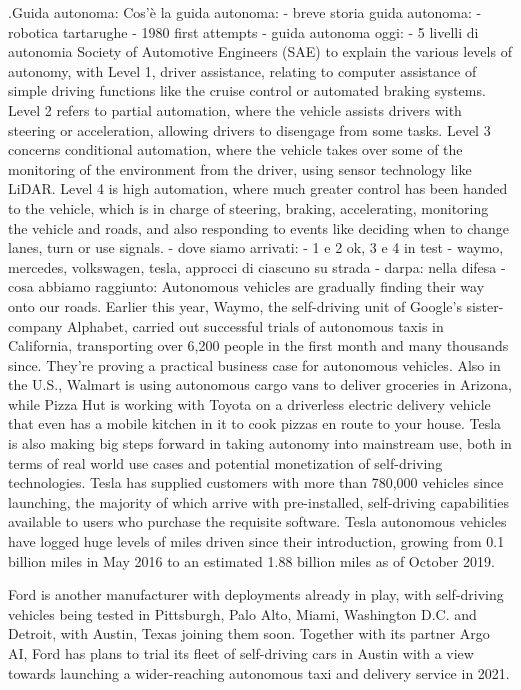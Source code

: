 .Guida autonoma:
Cos'è la guida autonoma:
- breve storia guida autonoma:
	- robotica tartarughe
	- 1980 first attempts
- guida autonoma oggi:
	- 5 livelli di autonomia
	Society of Automotive Engineers (SAE) to explain the various levels of autonomy, with Level 1, driver assistance, relating to computer assistance of simple driving functions like the cruise control or automated braking systems. Level 2 refers to partial automation, where the vehicle assists drivers with steering or acceleration, allowing drivers to disengage from some tasks. Level 3 concerns conditional automation, where the vehicle takes over some of the monitoring of the environment from the driver, using sensor technology like LiDAR. Level 4 is high automation, where much greater control has been handed to the vehicle, which is in charge of steering, braking, accelerating, monitoring the vehicle and roads, and also responding to events like deciding when to change lanes, turn or use signals.
	- dove siamo arrivati:
	    - 1 e 2 ok, 3 e 4 in test
		- waymo, mercedes, volkswagen, tesla, approcci di ciascuno
		su strada
		- darpa: nella difesa
	- cosa abbiamo raggiunto: 
	Autonomous vehicles are gradually finding their way onto our roads. Earlier this year, Waymo, the self-driving unit of Google's sister-company Alphabet, carried out successful trials of autonomous taxis in California, transporting over 6,200 people in the first month and many thousands since. They're proving a practical business case for autonomous vehicles.
Also in the U.S., Walmart is using autonomous cargo vans to deliver groceries in Arizona, while Pizza Hut is working with Toyota on a driverless electric delivery vehicle that even has a mobile kitchen in it to cook pizzas en route to your house.
Tesla is also making big steps forward in taking autonomy into mainstream use, both in terms of real world use cases and potential monetization of self-driving technologies. Tesla has supplied customers with more than 780,000 vehicles since launching, the majority of which arrive with pre-installed, self-driving capabilities available to users who purchase the requisite software. Tesla autonomous vehicles have logged huge levels of miles driven since their introduction, growing from 0.1 billion miles in May 2016 to an estimated 1.88 billion miles as of October 2019.

Ford is another manufacturer with deployments already in play, with self-driving vehicles being tested in Pittsburgh, Palo Alto, Miami, Washington D.C. and Detroit, with Austin, Texas joining them soon. Together with its partner Argo AI, Ford has plans to trial its fleet of self-driving cars in Austin with a view towards launching a wider-reaching autonomous taxi and delivery service in 2021.

